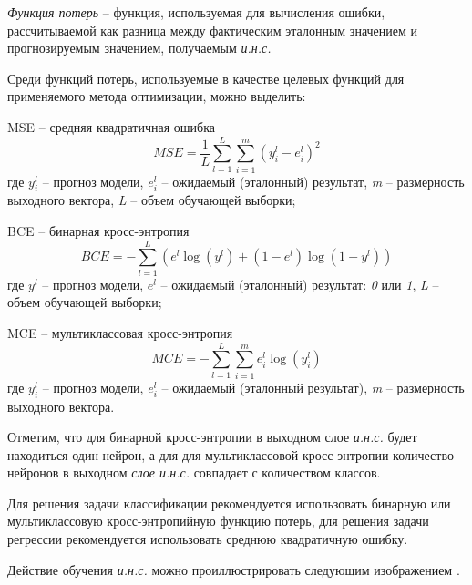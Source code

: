 \textit{Функция потерь} -- функция, используемая для вычисления ошибки, рассчитываемой как разница между фактическим эталонным значением и прогнозируемым значением, получаемым \textit{и.н.с.}

Среди функций потерь, используемые в качестве целевых функций для применяемого метода оптимизации, можно выделить:

\begin{textitemize}
	\item MSE -- средняя квадратичная ошибка\\
	\begin{equation*}
		MSE = \frac{1}{L} \sum_{l=1}^L \sum_{i=1}^m (y_i^l - e_i^l)^2
	\end{equation*}
	где $y_i^l$ -- прогноз модели, $e_i^l$ -- ожидаемый (эталонный) результат, \textit{m} -- размерность выходного вектора, \textit{L} -- объем обучающей выборки;

	\item BCE -- бинарная кросс-энтропия\\
	\begin{equation*}
		BCE = - \sum_{l=1}^L (e^l \log(y^l) + (1 - e^l)\log(1 - y^l))
	\end{equation*}
	где $y^l$ -- прогноз модели, $e^l$ -- ожидаемый (эталонный) результат: \textit{0} или \textit{1}, \textit{L} -- объем обучающей выборки;
	\item MCE -- мультиклассовая кросс-энтропия\\
	\begin{equation*}
		MCE = - \sum_{l=1}^L \sum_{i=1}^m e_{i}^l \log(y_{i}^l)
	\end{equation*}
	где $y_{i}^l$ -- прогноз модели, $e_i^l$ -- ожидаемый (эталонный результат), \textit{m} -- размерность выходного вектора.
\end{textitemize}

Отметим, что для бинарной кросс-энтропии в выходном слое \textit{и.н.с.} будет находиться один нейрон, а для для мультиклассовой кросс-энтропии количество нейронов в выходном \textit{слое и.н.с.} совпадает с количеством классов.

Для решения задачи классификации рекомендуется использовать бинарную или мультиклассовую кросс-энтропийную функцию потерь, для решения задачи регрессии рекомендуется использовать среднюю квадратичную ошибку.

Действие обучения \textit{и.н.с.} можно проиллюстрировать следующим изображением \textit{}.

